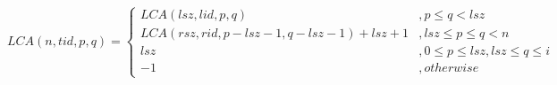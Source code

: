 \begin{figure*}[!thb]
  \normalsize
  \begin{equation}
    \mathit{LCA}(n, \mathit{tid}, p, q) = \begin{cases}
          \mathit{LCA}(\mathit{lsz}, \mathit{lid}, p, q) 
              &, p \le q < \mathit{lsz}\\ 
          \mathit{LCA}(\mathit{rsz}, \mathit{rid}, p-\mathit{lsz}-1, q-\mathit{lsz}-1)+\mathit{lsz}+1 
              &, \mathit{lsz} \le p \le q < n \\ 
          \mathit{lsz}
              &, 0 \le p \le \mathit{lsz}, \mathit{lsz} \le q \le i\\ 
          -1 
              &,\mathit{otherwise}
        \end{cases}
  \end{equation}
  \label{fun:LCA}
\end{figure*}